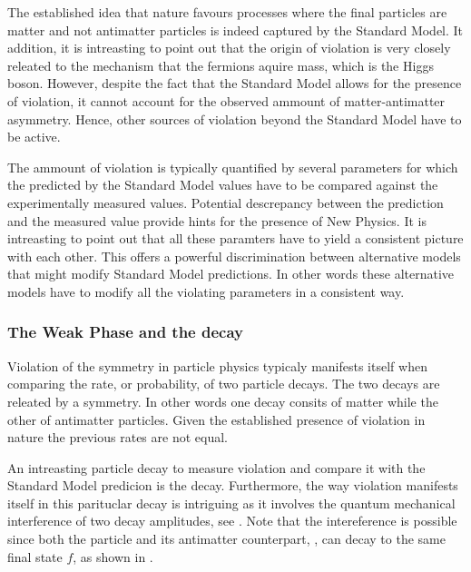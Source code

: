 The established idea that nature favours processes where the final particles are matter
and not antimatter particles is indeed captured by the Standard Model. It addition, it
is intreasting to point out that the origin of \CP violation is very closely releated
to the mechanism that the fermions aquire mass, which is the Higgs boson. However,
despite the fact that the Standard Model allows for the presence of \CP violation,
it cannot account for the observed ammount of matter-antimatter asymmetry.
Hence, other sources of \CP violation beyond the Standard Model have to be active.

The ammount of \CP violation is typically quantified by several parameters for which
the predicted by the Standard Model values have to be compared against the experimentally
measured values. Potential descrepancy between the prediction and the measured value
provide hints for the presence of New Physics. It is intreasting to point out that all these paramters have to yield
a consistent picture with each other. This offers a powerful discrimination between alternative models that might
modify Standard Model predictions. In other words these alternative models have to
modify all the \CP violating parameters in a consistent way.


\subsubsection{The Weak Phase \phis and the \BsJpsiKst decay}
Violation of the \CP symmetry in particle physics typicaly manifests itself when comparing
the rate, or probability, of two particle decays. The two decays are releated by a \CP symmetry.
In other words one decay consits of matter while the other of antimatter particles.
Given the established presence of \CP violation in nature the previous rates are not equal.

An intreasting particle decay to measure \CP violation and compare it with the Standard Model
predicion is the \BsJpsiPhi decay.
Furthermore, the way \CP violation manifests itself in this parituclar decay is intriguing
as it involves the quantum mechanical interference of two decay amplitudes, see .
Note that the intereference is possible since both the \Bs particle and its antimatter counterpart,
\Bsb, can decay to the same final state $f$, as shown in .

